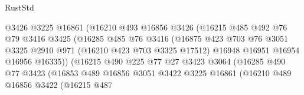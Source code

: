 \begin{lexlean}{RustStd}
\begin{coremodule}
                                  @3426
                                  @3225
                                  @16861
                                  (@16210
                                    @493
                                    @16856
                                    @3426
                                    (@16215
                                      @485
                                      @492
                                      @76
                                      @79
                                      @3416
                                      @3425
                                      (@16285
                                        @485
                                        @76
                                        @3416
                                        (@16875
                                          @423
                                          @703
                                          @76
                                          @3051
                                          @3325
                                          @2910
                                          @971
                                          (@16210 @423 @703 @3325 @17512)
                                          @16948
                                          @16951
                                          @16954
                                          @16956
                                          @16335))
                                      (@16215
                                        @490
                                        @225
                                        @77
                                        @27
                                        @3423
                                        @3064
                                        (@16285
                                          @490
                                          @77
                                          @3423
                                          (@16853
                                            @489
                                            @16856
                                            @3051
                                            @3422
                                            @3225
                                            @16861
                                            (@16210
                                              @489
                                              @16856
                                              @3422
                                              (@16215
                                                @487

\end{coremodule}
\end{lexlean}
